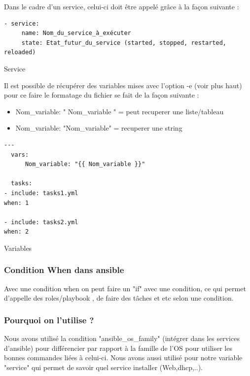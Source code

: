 \documentclass[a4paper, 12pt]{article}
\newenvironment{code}{\captionsetup{type=listing}}{}
\begin{document}
Dans le cadre d'un service, celui-ci doit être appelé grâce à la façon suivante :
\begin{code}
    \begin{verbatim}
- service:
     name: Nom_du_service_à_exécuter
     state: Etat_futur_du_service (started, stopped, restarted, reloaded)
    \end{verbatim}
    \caption{Service}
    \label{Service}
\end{code}
\bigbreak
\bigbreak
Il est possible de récupérer des variables mises avec l'option -e (voir plus haut) pour ce faire le formatage du fichier se fait de la façon suivante :
\begin{itemize}
    \item Nom\_variable: "{{ Nom\_variable }}" = peut recuperer une liste/tableau
    \item Nom\_variable: "Nom\_variable" = recuperer une string
\end{itemize}
\begin{code}
    \begin{verbatim}
---
  vars:
      Nom_variable: "{{ Nom_variable }}"

  tasks:
- include: tasks1.yml
when: 1

- include: tasks2.yml
when: 2
    \end{verbatim}
    \caption{Variables}
    \label{Variables}
\end{code}
\bigbreak

\subsubsection{Condition When dans ansible}
Avec une condition when on peut faire un "if" avec une condition, ce qui permet d'appelle des roles/playbook ,
de faire des tâches et etc selon une condition.

\subsubsection{Pourquoi on l'utilise ?}
Nous avons utilisé la condition "ansible\_os\_family" (intégrer dans les services d'ansible) pour différencier par
rapport à la famille de l'OS pour utiliser les bonnes commandes liées à celui-ci. Nous avons aussi utilisé pour
notre variable "service" qui permet de savoir quel service installer (Web,dhcp,..).
\end{document}
